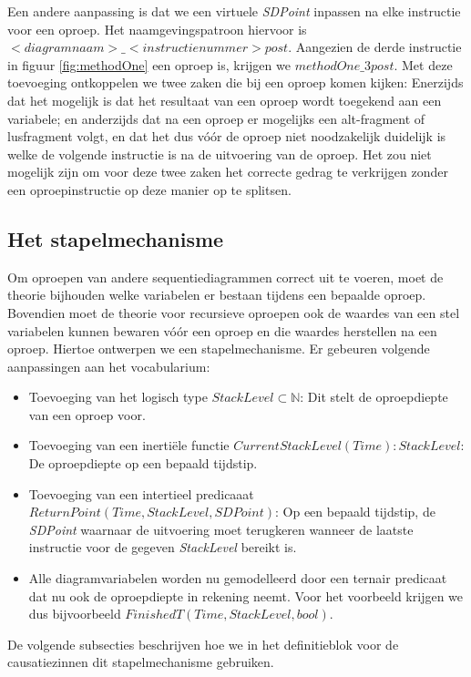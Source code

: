 Een andere aanpassing is dat we een virtuele \textit{SDPoint} inpassen na elke instructie voor een oproep. Het naamgevingspatroon hiervoor is $<diagramnaam>\_<instructienummer>post$. Aangezien de derde instructie in figuur \ref{fig:methodOne} een oproep is, krijgen we $methodOne\_3post$. Met deze toevoeging ontkoppelen we twee zaken die bij een oproep komen kijken: Enerzijds dat het mogelijk is dat het resultaat van een oproep wordt toegekend aan een variabele; en anderzijds dat na een oproep er mogelijks een alt-fragment of lusfragment volgt, en dat het dus v\'o\'or de oproep niet noodzakelijk duidelijk is welke de volgende instructie is na de uitvoering van de oproep. Het zou niet mogelijk zijn om voor deze twee zaken het correcte gedrag te verkrijgen zonder een oproepinstructie op deze manier op te splitsen.

\subsection{Het stapelmechanisme}
Om oproepen van andere sequentiediagrammen correct uit te voeren, moet de theorie bijhouden welke variabelen er bestaan tijdens een bepaalde oproep. Bovendien moet de theorie voor recursieve oproepen ook de waardes van een stel variabelen kunnen bewaren v\'o\'or een oproep en die waardes herstellen na een oproep. Hiertoe ontwerpen we een stapelmechanisme. Er gebeuren volgende aanpassingen aan het vocabularium:

\begin{itemize}
	\item Toevoeging van het logisch type $StackLevel \subset \mathbb{N}$: Dit stelt de oproepdiepte van een oproep voor.
	\item Toevoeging van een inerti\"ele functie $CurrentStackLevel(Time) : StackLevel$: De oproepdiepte op een bepaald tijdstip.
	\item Toevoeging van een intertieel predicaaat \\ $ReturnPoint(Time, StackLevel, SDPoint)$: Op een bepaald tijdstip, de \textit{SDPoint} waarnaar de uitvoering moet terugkeren wanneer de laatste instructie voor de gegeven \textit{StackLevel} bereikt is.
	\item Alle diagramvariabelen worden nu gemodelleerd door een ternair predicaat dat nu ook de oproepdiepte in rekening neemt. Voor het voorbeeld krijgen we dus bijvoorbeeld $FinishedT(Time, StackLevel, bool)$.
\end{itemize}

De volgende subsecties beschrijven hoe we in het definitieblok voor de causatiezinnen dit stapelmechanisme gebruiken.

